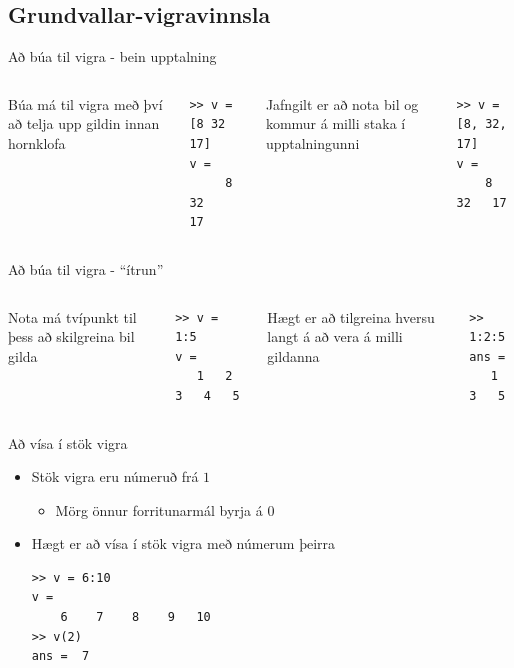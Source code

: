 \documentclass[handout]{beamer}
\begin{document}
\subsection{Grundvallar-vigravinnsla}

\begin{frame}[fragile]{Að búa til vigra - bein upptalning}
\begin{columns}
Búa má til vigra með því að telja upp gildin innan hornklofa
\begin{verbatim}
>> v = [8 32 17]
v =
     8    32    17
\end{verbatim} 
\pause
Jafngilt er að nota bil og kommur á milli staka í upptalningunni
\begin{verbatim}
>> v = [8, 32, 17]
v =
    8   32   17
\end{verbatim}
\end{columns}
\end{frame}

\begin{frame}[fragile]{Að búa til vigra - ``ítrun''}
\begin{columns}
Nota má tvípunkt til þess að skilgreina bil gilda
\begin{verbatim}
>> v = 1:5
v =
   1   2   3   4   5
\end{verbatim}
 \pause
Hægt er að tilgreina hversu langt á að vera á milli gildanna
\begin{verbatim}
>> 1:2:5
ans =
   1   3   5
\end{verbatim}
\end{columns}
\end{frame}

\begin{frame}[fragile]{Að vísa í stök vigra}
\begin{itemize}
 \item Stök vigra eru númeruð frá $1$
 \begin{itemize}
  \item Mörg önnur forritunarmál byrja á $0$
 \end{itemize}
 \item Hægt er að vísa í stök vigra með númerum þeirra
\begin{verbatim}
>> v = 6:10
v =
    6    7    8    9   10
>> v(2)
ans =  7
\end{verbatim}
\end{itemize}
\end{frame}
\end{document}

